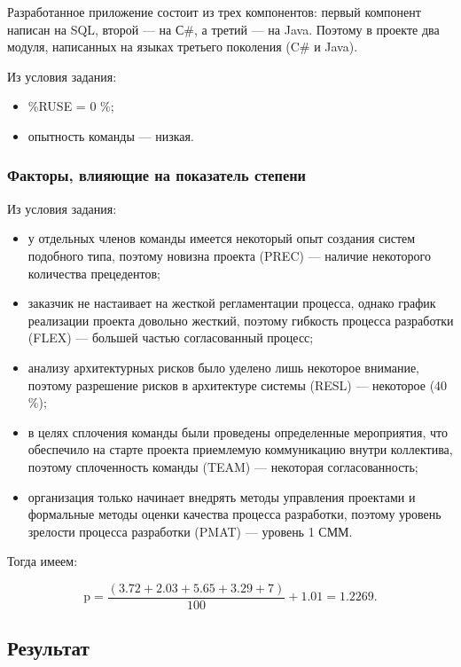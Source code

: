 Разработанное приложение состоит из трех компонентов: первый компонент написан
на SQL, второй --- на С\#, а третий --- на Java. Поэтому в проекте два модуля,
написанных на языках третьего поколения (C\# и Java).

Из условия задания:

\begin{itemize}
    \item \%RUSE = 0 \%;
    \item опытность команды --- низкая.
\end{itemize}

\subsubsection{Факторы, влияющие на показатель степени}

Из условия задания:

\begin{itemize}
    \item у отдельных членов команды имеется некоторый опыт создания систем подобного типа, поэтому новизна проекта (PREC) --- наличие некоторого количества прецедентов;
    \item заказчик не настаивает на жесткой регламентации процесса, однако график реализации проекта довольно жесткий, поэтому гибкость процесса разработки (FLEX) --- большей частью согласованный процесс;
    \item анализу архитектурных рисков было уделено лишь некоторое внимание, поэтому разрешение рисков в архитектуре системы (RESL) --- некоторое (40 \%);
    \item в целях сплочения команды были проведены определенные мероприятия, что обеспечило на старте проекта приемлемую коммуникацию внутри коллектива, поэтому сплоченность команды (TEAM) --- некоторая согласованность;
    \item организация только начинает внедрять методы управления проектами и формальные методы оценки качества процесса разработки, поэтому уровень зрелости процесса разработки (PMAT) --- уровень 1 СММ.
\end{itemize}

Тогда имеем:

$$\text{p} = \frac{(3.72 + 2.03 + 5.65 + 3.29 + 7)}{100} + 1.01 = 1.2269.$$

\subsection{Результат}

